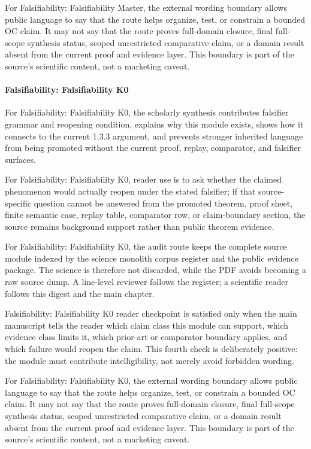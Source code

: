 For Falsifiability: Falsifiability Master, the external wording boundary allows public language to say that the route helps organize, test, or constrain a bounded OC claim. It may not say that the route proves full-domain closure, final full-scope synthesis status, scoped unrestricted comparative claim, or a domain result absent from the current proof and evidence layer. This boundary is part of the source's scientific content, not a marketing caveat.


\paragraph{Falsifiability: Falsifiability K0}

For Falsifiability: Falsifiability K0, the scholarly synthesis contributes falsifier grammar and reopening condition, explains why this module exists, shows how it connects to the current 1.3.3 argument, and prevents stronger inherited language from being promoted without the current proof, replay, comparator, and falsifier surfaces.


For Falsifiability: Falsifiability K0, reader use is to ask whether the claimed phenomenon would actually reopen under the stated falsifier; if that source-specific question cannot be answered from the promoted theorem, proof sheet, finite semantic case, replay table, comparator row, or claim-boundary section, the source remains background support rather than public theorem evidence.


For Falsifiability: Falsifiability K0, the audit route keeps the complete source module indexed by the science monolith corpus register and the public evidence package. The science is therefore not discarded, while the PDF avoids becoming a raw source dump. A line-level reviewer follows the register; a scientific reader follows this digest and the main chapter.


Falsifiability: Falsifiability K0 reader checkpoint is satisfied only when the main manuscript tells the reader which claim class this module can support, which evidence class limits it, which prior-art or comparator boundary applies, and which failure would reopen the claim. This fourth check is deliberately positive: the module must contribute intelligibility, not merely avoid forbidden wording.


For Falsifiability: Falsifiability K0, the external wording boundary allows public language to say that the route helps organize, test, or constrain a bounded OC claim. It may not say that the route proves full-domain closure, final full-scope synthesis status, scoped unrestricted comparative claim, or a domain result absent from the current proof and evidence layer. This boundary is part of the source's scientific content, not a marketing caveat.


